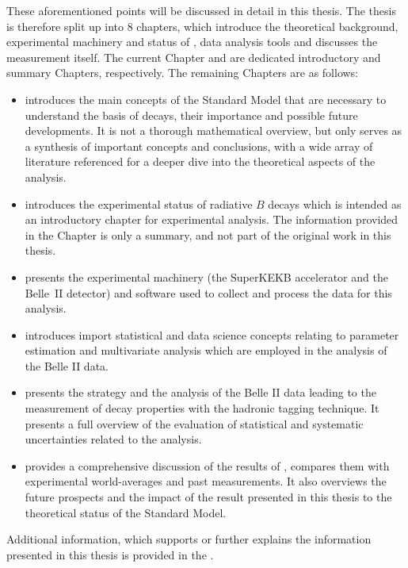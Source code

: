 These aforementioned points will be discussed in detail in this thesis.
The thesis is therefore split up into 8 chapters, which introduce the theoretical background, experimental machinery and status of \BtoXsgamma, data analysis tools and discusses the measurement itself.
The current Chapter and  are dedicated introductory and summary Chapters, respectively.
The remaining Chapters are as follows:
\begin{itemize}
    \item {} introduces the main concepts of the Standard Model that are necessary to understand the basis of \BtoXsgamma decays, their importance and possible future developments.
    It is not a thorough mathematical overview, but only serves as a synthesis of important concepts and conclusions, with a wide array of literature referenced for a deeper dive into the theoretical aspects of the analysis.
    \item {} introduces the experimental status of radiative $B$ decays which is intended as an introductory chapter for experimental \BtoXsgamma analysis.
    The information provided in the Chapter is only a summary, and not part of the original work in this thesis.
    \item {} presents the experimental machinery (the SuperKEKB accelerator and the Belle~II detector) and software used to collect and process the data for this analysis.
    \item {} introduces import statistical and data science concepts relating to parameter estimation and multivariate analysis which are employed in the analysis of the Belle II data.
    \item {} presents the strategy and the analysis of the Belle II data leading to the measurement of \BtoXsgamma decay properties with the hadronic tagging technique.
    It presents a full overview of the evaluation of statistical and systematic uncertainties related to the analysis.
    \item {} provides a comprehensive discussion of the results of , compares them with experimental world-averages and past measurements.
    It also overviews the future prospects and the impact of the result presented in this thesis to the theoretical status of the Standard Model.
\end{itemize}
Additional information, which supports or further explains the information presented in this thesis is provided in the .

